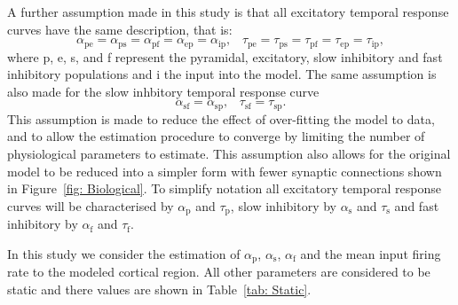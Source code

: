 \documentclass[10pt]{article}%
\begin{document}
A further assumption made in this study is that all excitatory temporal response curves have the same description, that is:
\begin{equation}\label{eq:ExcSynapse}
    \alpha_{\mathrm{pe}} = \alpha_{\mathrm{ps}} = \alpha_{\mathrm{pf}} = \alpha_{\mathrm{ep}} = \alpha_{\mathrm{ip}},\,\,\,\,\, \tau_{\mathrm{pe}} = \tau_{\mathrm{ps}} = \tau_{\mathrm{pf}} = \tau_{\mathrm{ep}} = \tau_{\mathrm{ip}},
\end{equation} where p, e, s, and f represent the pyramidal, excitatory, slow inhibitory and fast inhibitory populations and i the input into the model. The same assumption is also made for the slow inhbitory temporal response curve
		\begin{equation}\label{eq:InhSynapse}
		\alpha_{\mathrm{sf}} = \alpha_{\mathrm{sp}},\,\,\,\,\, \tau_{\mathrm{sf}} = \tau_{\mathrm{sp}}.
\end{equation}  This assumption is made to reduce the effect of over-fitting the model to data, and to allow the estimation procedure to converge by limiting the number of physiological parameters to estimate. This assumption also allows for the original model to be reduced into a simpler form with fewer synaptic connections shown in Figure~\ref{fig: Biological}. To simplify notation all excitatory temporal response curves will be characterised by $\alpha_{\mathrm{p}}$ and $\tau_{\mathrm{p}}$, slow inhibitory by $\alpha_{\mathrm{s}}$ and $\tau_{\mathrm{s}}$ and fast inhibitory by $\alpha_{\mathrm{f}}$ and $\tau_{\mathrm{f}}$. 

In this study we consider the estimation of $\alpha_{\mathrm{p}}$, $\alpha_{\mathrm{s}}$, $\alpha_{\mathrm{f}}$ and the mean input firing rate to the modeled cortical region. All other parameters are considered to be static and there values are shown in Table~\ref{tab: Static}.
\end{document}
